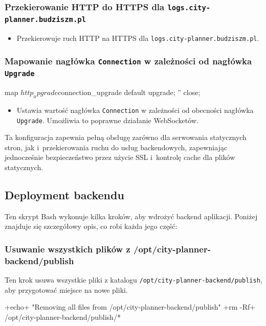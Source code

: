 \subsubsection{Przekierowanie HTTP do HTTPS dla \texttt{logs.city-planner.budziszm.pl}}
\begin{itemize}
    \item Przekierowuje ruch HTTP na HTTPS dla \texttt{logs.city-planner.budziszm.pl}.
\end{itemize}

\subsubsection{Mapowanie nagłówka \texttt{Connection} w zależności od nagłówka \texttt{Upgrade}}
\begin{longlisting}[language=nginx,label={lst:n11}]
map $http_upgrade $connection_upgrade {
  default upgrade;
  ''      close;
}
\end{longlisting}
\begin{itemize}
    \item Ustawia wartość nagłówka \texttt{Connection} w zależności od obecności nagłówka \texttt{Upgrade}.
    Umożliwia to poprawne działanie WebSocketów.
\end{itemize}

Ta konfiguracja zapewnia pełną obsługę zarówno dla serwowania statycznych stron, jak i~przekierowania ruchu do usług backendowych, zapewniając jednocześnie bezpieczeństwo przez użycie SSL i~kontrolę cache dla plików statycznych.

\subsection{Deployment backendu}
\label{subsec:deployment-backendu}
Ten skrypt Bash wykonuje kilka kroków, aby wdrożyć backend aplikacji.
Poniżej znajduje się szczegółowy opis, co robi każda jego część:

\subsubsection{Usuwanie wszystkich plików z /opt/city-planner-backend/publish}
Ten krok usuwa wszystkie pliki z katalogu \texttt{/opt/city-planner-backend/publish}, aby przygotować miejsce na nowe pliki.
\begin{longlisting}[style=shell-colored,label={lst:db1}]
+echo+ "Removing all files from /opt/city-planner-backend/publish"
+rm -Rf+ /opt/city-planner-backend/publish/*
\end{longlisting}


